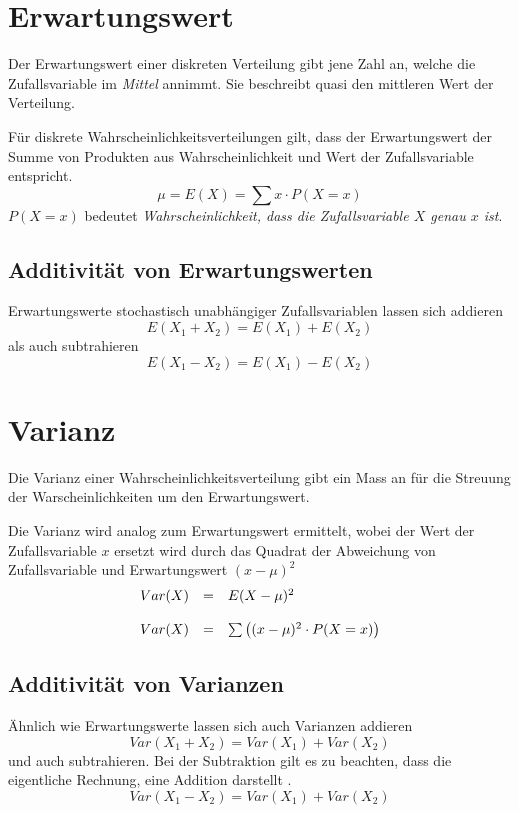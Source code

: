 \clearpage

\section{Erwartungswert}
Der Erwartungswert einer diskreten Verteilung gibt jene Zahl an,
welche die Zufallsvariable im \emph{Mittel} annimmt. Sie beschreibt
quasi den mittleren Wert der Verteilung.

Für diskrete Wahrscheinlichkeitsverteilungen gilt, dass der 
Erwartungswert der Summe von Produkten aus Wahrscheinlichkeit und
Wert der Zufallsvariable entspricht. 
\[ \mu = E(X) = \sum x \cdot P(X=x) \]
$P(X=x)$ bedeutet \emph{Wahrscheinlichkeit, dass die Zufallsvariable $X$ 
genau $x$ ist}.

\subsection{Additivität von Erwartungswerten}
Erwartungswerte stochastisch unabhängiger Zufallsvariablen lassen sich
addieren
\[  
	E(X_1 + X_2) = E(X_1) + E(X_2)
\]
als auch subtrahieren
\[  
	E(X_1 - X_2) = E(X_1) - E(X_2)
\]

\section{Varianz}
Die Varianz einer Wahrscheinlichkeitsverteilung gibt ein Mass an für 
die Streuung der Warscheinlichkeiten um den Erwartungswert.

Die Varianz wird analog zum Erwartungswert ermittelt, wobei der Wert
der Zufallsvariable $x$ ersetzt wird durch das Quadrat der Abweichung
von Zufallsvariable und Erwartungswert $(x-\mu)^2$
\[ \begin{array}{l c l}
	Var(X) 
		& = 
		& E(X-\mu)^2 \\
	& &  \\
	Var(X)
		& = 
		& \sum \left( (x-\mu)^2 \cdot P(X=x) \right)
\end{array} \]

\subsection{Additivität von Varianzen}
Ähnlich wie Erwartungswerte lassen sich auch Varianzen addieren
\[  
	Var(X_1 + X_2) = Var(X_1) + Var(X_2)
\]
und auch subtrahieren. Bei der Subtraktion gilt es zu beachten,
dass die eigentliche Rechnung, eine Addition darstellt
\parencite[231]{oreilly}.
\[  
	Var(X_1 - X_2) = Var(X_1) + Var(X_2)
\]

